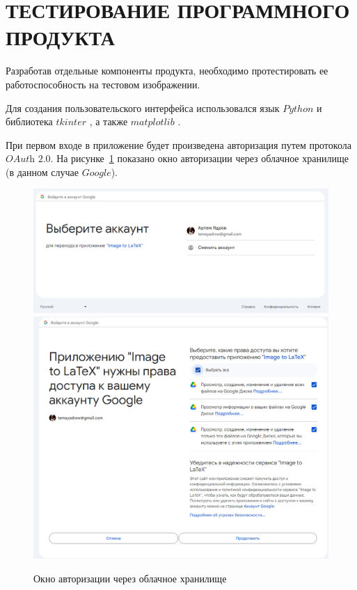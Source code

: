 \section{ТЕСТИРОВАНИЕ ПРОГРАММНОГО ПРОДУКТА}

Разработав отдельные компоненты продукта, необходимо протестировать ее работоспособность на тестовом изображении.

Для создания пользовательского интерфейса использовался язык $Python$ и библиотека $tkinter$ \cite{tkinter}, а также $matplotlib$ \cite{matplot}.

При первом входе в приложение будет произведена авторизация путем протокола $\textit{OAuth 2.0}$. На рисунке~\ref{auth_window} показано окно авторизации через облачное хранилище (в данном случае $Google$).

\begin{figure}
    \includegraphics[scale=0.5]{img/app/oauth_1.png}
    \includegraphics[scale=0.3]{img/app/oauth_2.png}
    \caption{Окно авторизации через облачное хранилище}
    \label{auth_window}
\end{figure}

